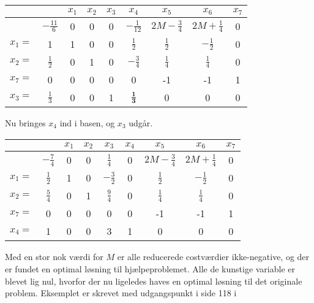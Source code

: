 \begin{eks}
\begin{center}
\begin{tabular}{|c|c|ccccccc|}
\hline
	 &  & $x_1$ & $x_2$ & $x_3$ & $x_4$ & $x_5$ & $x_6$ & $x_7$ \\
\hline
	 & $- \frac{11}{6}$ & 0 & 0 & 0 & $-\frac{1}{12}$ & $2M-\frac{3}{4}$ & $2M+ \frac{1}{4}$ & 0 \\
\hline
	$x_1=$ & 1 & 1 & 0 & 0 & $\frac{1}{2}$ & $\frac{1}{2}$ & $-\frac{1}{2}$ & 0 \\
	$x_2=$ & $\frac{1}{2}$ & 0 & 1 & 0 & $-\frac{3}{4}$ & $\frac{1}{4}$ & $\frac{1}{4}$ & 0 \\
	$x_7=$ & 0 & 0 & 0 & 0 & 0 & -1 & -1 & 1 \\
	$x_3=$ & $\frac{1}{3}$ & 0 & 0 & 1 & $\mathbf{\frac{1}{3}}$ & 0 & 0 & 0 \\
\hline
\end{tabular}
\end{center}

Nu bringes $x_4$ ind i basen, og $x_3$ udgår. 

\begin{center}
\begin{tabular}{|c|c|ccccccc|}
\hline
	 &  & $x_1$ & $x_2$ & $x_3$ & $x_4$ & $x_5$ & $x_6$ & $x_7$ \\
\hline
	 & $- \frac{7}{4}$ & 0 & 0 & $\frac{1}{4}$ & 0 & $2M-\frac{3}{4}$ & $2M+ \frac{1}{4}$ & 0 \\
\hline
	$x_1=$ & $\frac{1}{2}$ & 1 & 0 & $-\frac{3}{2}$ & 0 & $\frac{1}{2}$ & $-\frac{1}{2}$ & 0 \\
	$x_2=$ & $\frac{5}{4}$ & 0 & 1 & $\frac{9}{4}$ & 0 & $\frac{1}{4}$ & $\frac{1}{4}$ & 0 \\
	$x_7=$ & 0 & 0 & 0 & 0 & 0 & -1 & -1 & 1 \\
	$x_4=$ & 1 & 0 & 0 & 3 & 1 & 0 & 0 & 0 \\
\hline
\end{tabular}
\end{center}

Med en stor nok værdi for $M$ er alle reducerede costværdier ikke-negative, og der er fundet en optimal løsning til hjælpeproblemet.
Alle de kunstige variable er blevet lig nul, hvorfor der nu ligeledes haves en optimal løsning til det originale problem. Eksemplet er skrevet med udgangspunkt i side 118 i \citep{bert}
\end{eks}
